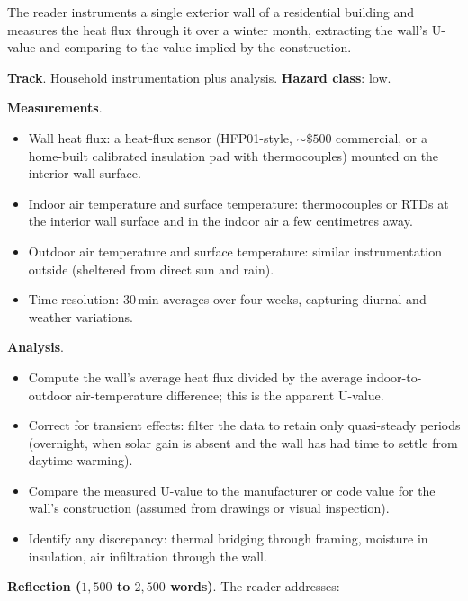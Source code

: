 \begin{project}
The reader instruments a single exterior wall of a residential
building and measures the heat flux through it over a winter month,
extracting the wall's U-value and comparing to the value implied by
the construction.

\textbf{Track}. Household instrumentation plus analysis.
\textbf{Hazard class}: low.

\textbf{Measurements}.

\begin{itemize}[leftmargin=*]
  \item Wall heat flux: a heat-flux sensor (HFP01-style, $\sim
    \$ 500$ commercial, or a home-built calibrated insulation pad
    with thermocouples) mounted on the interior wall surface.
  \item Indoor air temperature and surface temperature: thermocouples
    or RTDs at the interior wall surface and in the indoor air a
    few centimetres away.
  \item Outdoor air temperature and surface temperature: similar
    instrumentation outside (sheltered from direct sun and rain).
  \item Time resolution: $30\,\text{min}$ averages over four weeks,
    capturing diurnal and weather variations.
\end{itemize}

\textbf{Analysis}.

\begin{itemize}[leftmargin=*]
  \item Compute the wall's average heat flux divided by the average
    indoor-to-outdoor air-temperature difference; this is the
    apparent U-value.
  \item Correct for transient effects: filter the data to retain only
    quasi-steady periods (overnight, when solar gain is absent and
    the wall has had time to settle from daytime warming).
  \item Compare the measured U-value to the manufacturer or code
    value for the wall's construction (assumed from drawings or
    visual inspection).
  \item Identify any discrepancy: thermal bridging through framing,
    moisture in insulation, air infiltration through the wall.
\end{itemize}

\textbf{Reflection ($1{,}500$ to $2{,}500$ words)}. The reader
addresses:


\end{project}
